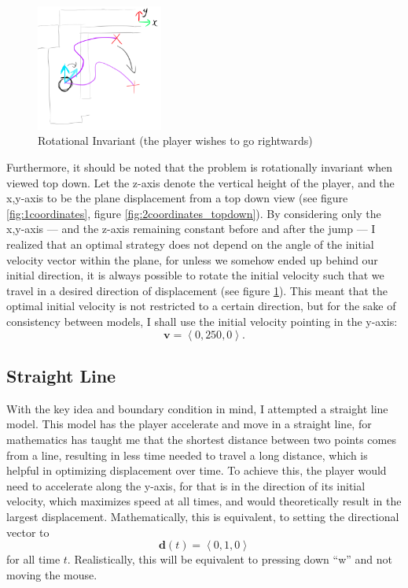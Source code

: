 \documentclass[a4paper,12pt]{article}
\newcommand{\tvec}[1]{\boldsymbol{#1}}
\newcommand{\tang}[1]{\left\langle #1 \right\rangle}
\newcommand{\td}{\tvec{d}}
\newcommand{\tv}{\tvec{v}}
\begin{document}
\begin{figure}
    \includegraphics[width=0.37\textwidth,right]{assets/2turning.png}
    \caption{Rotational Invariant (the player wishes to go rightwards)}
    \label{fig:2turning}
\end{figure}

Furthermore, it should be noted that the problem is rotationally invariant when viewed top down. Let the z-axis denote the vertical height of the player, and the x,y-axis to be the plane displacement from a top down view (see figure \ref{fig:1coordinates}, figure \ref{fig:2coordinates_topdown}). By considering only the x,y-axis --- and the z-axis remaining constant before and after the jump --- I realized that an optimal strategy does not depend on the angle of the initial velocity vector within the plane, for unless we somehow ended up behind our initial direction, it is always possible to rotate the initial velocity such that we travel in a desired direction of displacement (see figure \ref{fig:2turning}). This meant that the optimal initial velocity is not restricted to a certain direction, but for the sake of consistency between models, I shall use the initial velocity pointing in the y-axis:
\[
    \tv = \tang{0, 250, 0}.
\]

\subsection{Straight Line}
With the key idea and boundary condition in mind, I attempted a straight line model. This model has the player accelerate and move in a straight line, for mathematics has taught me that the shortest distance between two points comes from a line, resulting in less time needed to travel a long distance, which is helpful in optimizing displacement over time. To achieve this, the player would need to accelerate along the y-axis, for that is in the direction of its initial velocity, which maximizes speed at all times, and would theoretically result in the largest displacement. Mathematically, this is equivalent, to setting the directional vector to
\[
    \td(t) = \tang{0, 1, 0}
\]
for all time $t$. Realistically, this will be equivalent to pressing down ``w'' and not moving the mouse.
\end{document}
